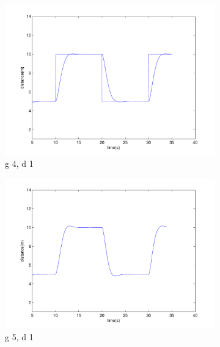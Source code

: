 \begin{figure}
        \begin{subfigure}[b]{0.3\textwidth}
                \includegraphics[width=\textwidth]{fig/gain4d1.pdf}
                \caption{g 4, d 1}
                \label{fig:mouse}
        \end{subfigure}
                \begin{subfigure}[b]{0.3\textwidth}
                \includegraphics[width=\textwidth]{fig/gain5d1.pdf}
                \caption{g 5, d 1}
                \label{fig:gull}
        \end{subfigure}%
        ~ %
        \begin{subfigure}[b]{0.3\textwidth}

\end{subfigure}
\end{figure}
